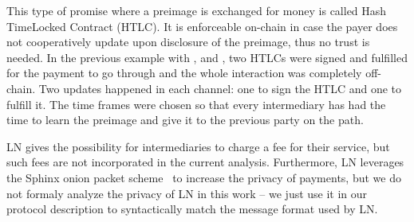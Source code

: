     This type of promise where a preimage is exchanged for money is called Hash
    TimeLocked Contract (HTLC). It is enforceable on-chain in case the payer
    does not cooperatively update upon disclosure of the preimage, thus no trust
    is needed. In the previous example with \alice{}, \bob{} and \charlie, two HTLCs were signed and fulfilled for the payment to go through and the whole interaction was  completely off-chain. Two updates happened
    in each channel: one to sign the HTLC and one to fulfill it. The time frames
    were chosen so that every intermediary has had the time to learn the
    preimage and give it to the previous party on the path.

    LN gives the possibility for intermediaries to charge a fee for their
    service, but such fees are not incorporated in the current analysis.
    Furthermore, LN leverages the Sphinx onion packet scheme~\cite{sphinx} to
    increase the privacy of payments, but we do not formaly analyze the privacy
    of LN in this work -- we just use it in our protocol description to
    syntactically match the message format used by LN.
